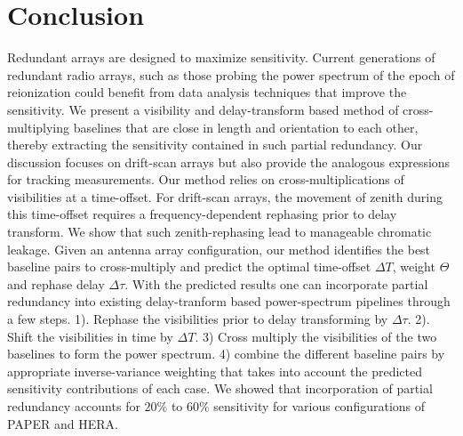 \documentclass[twocolumn,apj,numberedappendix]{emulateapj}
\renewcommand\[{\begin{equation}}
\renewcommand\]{\end{equation}}
\begin{document}












\section{Conclusion}
Redundant arrays are designed to maximize sensitivity. Current generations of redundant radio arrays, such as those probing the power spectrum of the epoch of reionization could benefit from data analysis techniques that improve the sensitivity. We present a visibility and delay-transform based method of cross-multiplying baselines that are close in length and orientation to each other, thereby extracting the sensitivity contained in such partial redundancy. Our discussion focuses on drift-scan arrays but also provide the analogous expressions for tracking measurements. Our method relies on cross-multiplications of visibilities at a time-offset. For drift-scan arrays, the movement of zenith during this time-offset requires a frequency-dependent rephasing prior to delay transform. We show that such zenith-rephasing lead to manageable chromatic leakage. Given an antenna array configuration, our method identifies the best baseline pairs to cross-multiply and predict the optimal time-offset $\Delta T$, weight $\Theta$ and rephase delay $\Delta\tau$. With the predicted results one can incorporate partial redundancy into existing delay-tranform based power-spectrum pipelines through a few steps. 1). Rephase the visibilities prior to delay transforming by $\Delta\tau$. 2). Shift the visibilities in time by $\Delta T$. 3) Cross multiply the visibilities of the two baselines  to form the power spectrum. 4) combine the different baseline pairs by appropriate inverse-variance weighting that takes into account the predicted sensitivity contributions of each case. We showed that incorporation of partial redundancy accounts for $20\%$ to $60\%$ sensitivity for various configurations of PAPER and HERA. 
\end{document}
